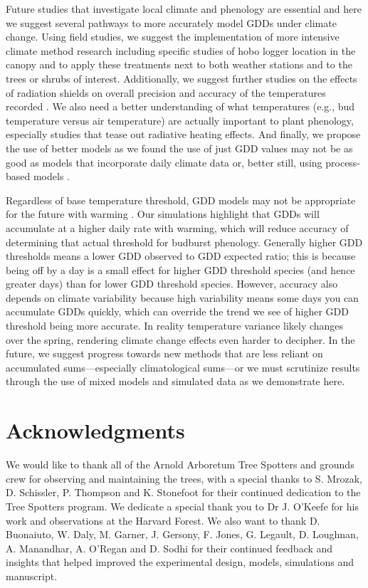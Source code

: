 \documentclass{article}\usepackage[]{graphicx}\usepackage[]{color}
\begin{document}
Future studies that investigate local climate and phenology are essential and here we suggest several pathways to more accurately model GDDs under climate change. Using field studies, we suggest the implementation of more intensive climate method research including specific studies of hobo logger location in the canopy and to apply these treatments next to both weather stations and to the trees or shrubs of interest. Additionally, we suggest further studies on the effects of radiation shields on overall precision and accuracy of the temperatures recorded \citep{daCunha2015}. We also need a better understanding of what temperatures (e.g., bud temperature versus air temperature) are actually important to plant phenology, especially studies that tease out radiative heating effects. And finally, we propose the use of better models as we found the use of just GDD values may not be as good as models that incorporate daily climate data or, better still, using process-based models \citep{Keenan2019}. 
 
Regardless of base temperature threshold, GDD models may not be appropriate for the future with warming \citep{Man2010}. Our simulations highlight that GDDs will accumulate at a higher daily rate with warming, which will reduce accuracy of determining that actual threshold for budburst phenology. Generally higher GDD thresholds means a lower GDD observed to GDD expected ratio; this is because being off by a day is a small effect for higher GDD threshold species (and hence greater days) than for lower GDD threshold species. However, accuracy also depends on climate variability because high variability means some days you can accumulate GDDs quickly, which can override the trend we see of higher GDD threshold being more accurate. In reality temperature variance likely changes over the spring, rendering climate change effects even harder to decipher. In the future, we suggest progress towards new methods that are less reliant on accumulated sums---especially climatological sums---or we must scrutinize results through the use of mixed models and simulated data as we demonstrate here.

\section*{Acknowledgments}
We would like to thank all of the Arnold Arboretum Tree Spotters and grounds crew for observing and maintaining the trees, with a special thanks to S. Mrozak, D. Schissler, P. Thompson and K. Stonefoot for their continued dedication to the Tree Spotters program. We dedicate a special thank you to Dr J. O'Keefe for his work and observations at the Harvard Forest. We also want to thank D. Buonaiuto, W. Daly, M. Garner, J. Gersony, F. Jones, G. Legault, D. Loughnan, A. Manandhar, A. O'Regan and D. Sodhi for their continued feedback and insights that helped improved the experimental design, models, simulations and manuscript. 
\end{document}
